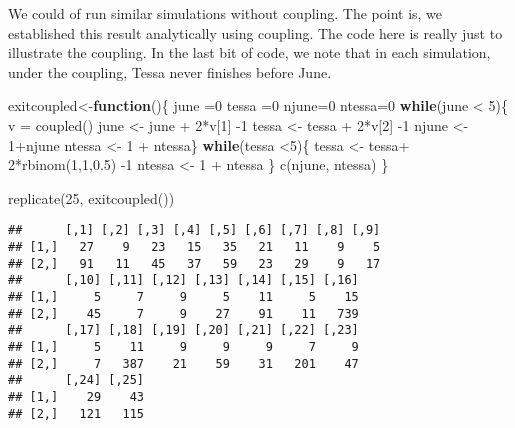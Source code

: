 \documentclass[
]{article}
\newenvironment{Shaded}{\begin{snugshade}}{\end{snugshade}}
\newcommand{\ControlFlowTok}[1]{\textcolor[rgb]{0.13,0.29,0.53}{\textbf{#1}}}
\newcommand{\DecValTok}[1]{\textcolor[rgb]{0.00,0.00,0.81}{#1}}
\newcommand{\FloatTok}[1]{\textcolor[rgb]{0.00,0.00,0.81}{#1}}
\newcommand{\FunctionTok}[1]{\textcolor[rgb]{0.00,0.00,0.00}{#1}}
\newcommand{\NormalTok}[1]{#1}
\newcommand{\OtherTok}[1]{\textcolor[rgb]{0.56,0.35,0.01}{#1}}
\newcommand{\SpecialCharTok}[1]{\textcolor[rgb]{0.00,0.00,0.00}{#1}}
\theoremstyle{definition}
\theoremstyle{definition}
\theoremstyle{definition}
\theoremstyle{definition}
\theoremstyle{remark}
\begin{document}
We could of run similar simulations without coupling. The point is, we established this result analytically using coupling. The code here is really just to illustrate the coupling. In the last bit of code, we note that in each simulation, under the coupling, Tessa never finishes before June.

\begin{Shaded}
\begin{Highlighting}[]
\NormalTok{exitcoupled}\OtherTok{\textless{}{-}}\ControlFlowTok{function}\NormalTok{()\{}
\NormalTok{  june }\OtherTok{=}\DecValTok{0}
\NormalTok{  tessa }\OtherTok{=}\DecValTok{0}
\NormalTok{  njune}\OtherTok{=}\DecValTok{0}
\NormalTok{  ntessa}\OtherTok{=}\DecValTok{0}
  \ControlFlowTok{while}\NormalTok{(june }\SpecialCharTok{\textless{}} \DecValTok{5}\NormalTok{)\{}
\NormalTok{    v }\OtherTok{=} \FunctionTok{coupled}\NormalTok{()}
\NormalTok{    june }\OtherTok{\textless{}{-}}\NormalTok{ june }\SpecialCharTok{+} \DecValTok{2}\SpecialCharTok{*}\NormalTok{v[}\DecValTok{1}\NormalTok{] }\SpecialCharTok{{-}}\DecValTok{1}
\NormalTok{    tessa }\OtherTok{\textless{}{-}}\NormalTok{ tessa }\SpecialCharTok{+} \DecValTok{2}\SpecialCharTok{*}\NormalTok{v[}\DecValTok{2}\NormalTok{] }\SpecialCharTok{{-}}\DecValTok{1}
\NormalTok{    njune }\OtherTok{\textless{}{-}} \DecValTok{1}\SpecialCharTok{+}\NormalTok{njune}
\NormalTok{    ntessa }\OtherTok{\textless{}{-}} \DecValTok{1} \SpecialCharTok{+}\NormalTok{ ntessa\}}
  \ControlFlowTok{while}\NormalTok{(tessa }\SpecialCharTok{\textless{}}\DecValTok{5}\NormalTok{)\{}
\NormalTok{    tessa }\OtherTok{\textless{}{-}}\NormalTok{ tessa}\SpecialCharTok{+} \DecValTok{2}\SpecialCharTok{*}\FunctionTok{rbinom}\NormalTok{(}\DecValTok{1}\NormalTok{,}\DecValTok{1}\NormalTok{,}\FloatTok{0.5}\NormalTok{) }\SpecialCharTok{{-}}\DecValTok{1}
\NormalTok{ntessa }\OtherTok{\textless{}{-}} \DecValTok{1} \SpecialCharTok{+}\NormalTok{ ntessa}
\NormalTok{  \}}
\FunctionTok{c}\NormalTok{(njune, ntessa)  }
\NormalTok{\}}
\end{Highlighting}
\end{Shaded}

\begin{Shaded}
\begin{Highlighting}[]
\FunctionTok{replicate}\NormalTok{(}\DecValTok{25}\NormalTok{, }\FunctionTok{exitcoupled}\NormalTok{())}
\end{Highlighting}
\end{Shaded}

\begin{verbatim}
##      [,1] [,2] [,3] [,4] [,5] [,6] [,7] [,8] [,9]
## [1,]   27    9   23   15   35   21   11    9    5
## [2,]   91   11   45   37   59   23   29    9   17
##      [,10] [,11] [,12] [,13] [,14] [,15] [,16]
## [1,]     5     7     9     5    11     5    15
## [2,]    45     7     9    27    91    11   739
##      [,17] [,18] [,19] [,20] [,21] [,22] [,23]
## [1,]     5    11     9     9     9     7     9
## [2,]     7   387    21    59    31   201    47
##      [,24] [,25]
## [1,]    29    43
## [2,]   121   115
\end{verbatim}
\end{document}
